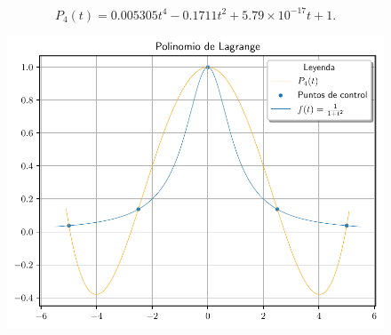 \begin{frame}
    \begin{solution}
        \begin{equation*}
            P_{4}\left(t\right)=
            0.005305t^{4}-
            0.1711t^{2}+
            5.79\times 10^{-17}t+
            1.
        \end{equation*}
        \begin{figure}[ht!]
            \centering
            \includegraphics[width=.5\paperwidth]{p12_lagrange5}
        \end{figure}
    \end{solution}
\end{frame}

